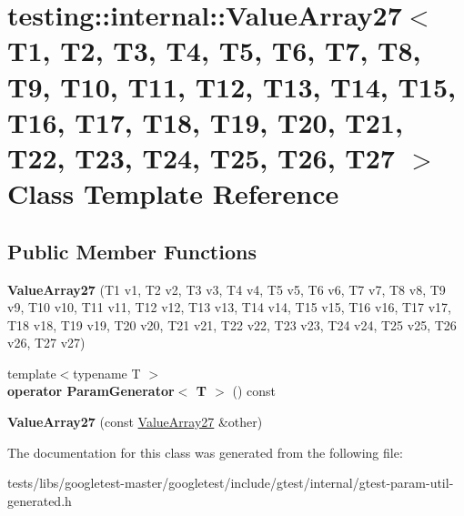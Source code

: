 \hypertarget{classtesting_1_1internal_1_1ValueArray27}{}\section{testing\+:\+:internal\+:\+:Value\+Array27$<$ T1, T2, T3, T4, T5, T6, T7, T8, T9, T10, T11, T12, T13, T14, T15, T16, T17, T18, T19, T20, T21, T22, T23, T24, T25, T26, T27 $>$ Class Template Reference}
\label{classtesting_1_1internal_1_1ValueArray27}
\subsection*{Public Member Functions}
\begin{DoxyCompactItemize}
\item 
\mbox{\label{classtesting_1_1internal_1_1ValueArray27_a17b34a604c556eef28039dc4c5d0343f}} 
{\bfseries Value\+Array27} (T1 v1, T2 v2, T3 v3, T4 v4, T5 v5, T6 v6, T7 v7, T8 v8, T9 v9, T10 v10, T11 v11, T12 v12, T13 v13, T14 v14, T15 v15, T16 v16, T17 v17, T18 v18, T19 v19, T20 v20, T21 v21, T22 v22, T23 v23, T24 v24, T25 v25, T26 v26, T27 v27)
\item 
\mbox{\label{classtesting_1_1internal_1_1ValueArray27_af120f76a65da981182ecfaa8846a10bd}} 
{\footnotesize template$<$typename T $>$ }\\{\bfseries operator Param\+Generator$<$ T $>$} () const
\item 
\mbox{\label{classtesting_1_1internal_1_1ValueArray27_a84702665e9f3180487c8061b2981202d}} 
{\bfseries Value\+Array27} (const \hyperlink{classtesting_1_1internal_1_1ValueArray27}{Value\+Array27} \&other)
\end{DoxyCompactItemize}


The documentation for this class was generated from the following file\+:\begin{DoxyCompactItemize}
\item 
tests/libs/googletest-\/master/googletest/include/gtest/internal/gtest-\/param-\/util-\/generated.\+h\end{DoxyCompactItemize}
